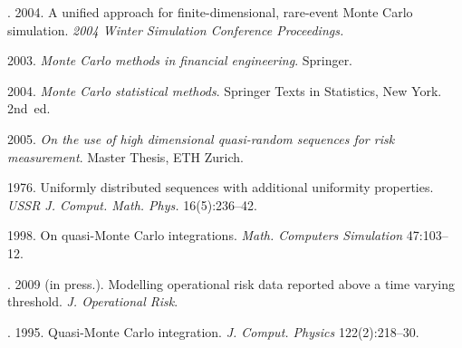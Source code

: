 \begin{multicols}{2}
{{\begin{thebibliography}{99}
.
2004. A unified approach for
finite-dimensional, rare-event Monte Carlo simulation.
\textit{2004 Winter Simulation Conference Proceedings.}

2003. \textit{Monte Carlo methods in financial engineering}.
Springer.




2004. \textit{Monte Carlo statistical
methods}.  Springer Texts in Statistics, New York. 2nd~ed.

2005. \textit{On the use of high dimensional quasi-random
sequences for risk measurement}. Master Thesis, ETH Zurich.

1976. Uniformly distributed sequences with additional
uniformity properties. \textit{USSR J. Comput. Math.
Phys.} 16(5):236--42.

1998. On quasi-Monte Carlo integrations. \textit{Math. Computers Simulation} 47:103--12.


.
2009 (in press.). Modelling operational risk data
reported above a time varying threshold.
\textit{J. Operational Risk}.

.
1995. Quasi-Monte Carlo integration.
\textit{J. Comput. Physics} 122(2):218--30.









\end{thebibliography}
}
}
\end{multicols}
\renewcommand{\figurename}{\protect\bf Рис.}
\renewcommand{\tablename}{\protect\bf Таблица}
\renewcommand{\bibname}{\protect\rmfamily Литература}

